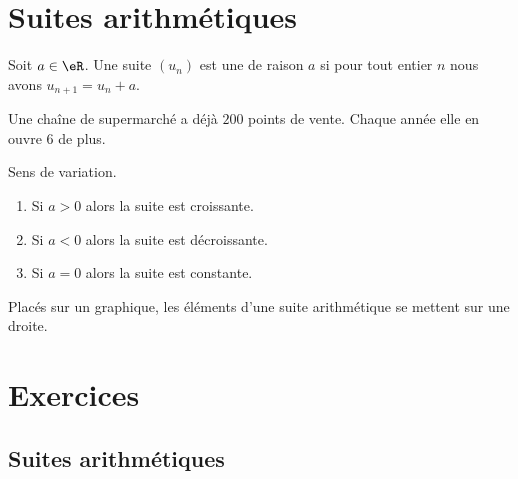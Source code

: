 
\section{Suites arithmétiques}

\begin{definition}
    Soit \( a\in \eR\). Une suite \( (u_n)\) est une  de raison \( a\) si pour tout entier \( n\) nous avons \( u_{n+1}=u_n+a\).
\end{definition}

\begin{example}
    Une chaîne de supermarché a déjà \( 200\) points de vente. Chaque année elle en ouvre \( 6\) de plus.
\end{example}

\begin{Aretenir}
    Sens de variation.
    \begin{enumerate}
        \item
            Si \( a>0\) alors la suite est croissante.
        \item
            Si \( a<0\) alors la suite est décroissante.
        \item
            Si \( a=0\) alors la suite est constante.
    \end{enumerate}
\end{Aretenir}
Placés sur un graphique, les éléments d'une suite arithmétique se mettent sur une droite.

\section{Exercices}

\subsection{Suites arithmétiques}


